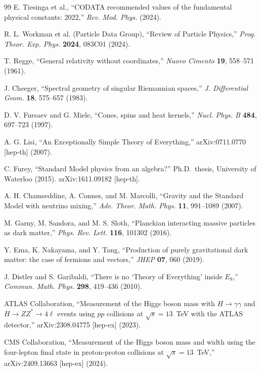 \documentclass[12pt,a4paper]{article}
\theoremstyle{definition}
\begin{document}
\begin{thebibliography}{99}
E. Tiesinga et al., ``CODATA recommended values of the fundamental physical constants: 2022,'' \textit{Rev. Mod. Phys.} (2024).

R. L. Workman et al. (Particle Data Group), ``Review of Particle Physics,'' \textit{Prog. Theor. Exp. Phys.} \textbf{2024}, 083C01 (2024).

T. Regge, ``General relativity without coordinates,'' \textit{Nuovo Cimento} \textbf{19}, 558--571 (1961).

J. Cheeger, ``Spectral geometry of singular Riemannian spaces,'' \textit{J. Differential Geom.} \textbf{18}, 575--657 (1983).

D. V. Fursaev and G. Miele, ``Cones, spins and heat kernels,'' \textit{Nucl. Phys. B} \textbf{484}, 697--723 (1997).

A. G. Lisi, ``An Exceptionally Simple Theory of Everything,'' arXiv:0711.0770 [hep-th] (2007).

C. Furey, ``Standard Model physics from an algebra?'' Ph.D.\ thesis, University of Waterloo (2015). arXiv:1611.09182 [hep-th].

A. H. Chamseddine, A. Connes, and M. Marcolli, ``Gravity and the Standard Model with neutrino mixing,'' \textit{Adv. Theor. Math. Phys.} \textbf{11}, 991--1089 (2007).

M. Garny, M. Sandora, and M. S. Sloth, ``Planckian interacting massive particles as dark matter,'' \textit{Phys. Rev. Lett.} \textbf{116}, 101302 (2016).

Y. Ema, K. Nakayama, and Y. Tang, ``Production of purely gravitational dark matter: the case of fermions and vectors,'' \textit{JHEP} \textbf{07}, 060 (2019).

J. Distler and S. Garibaldi, ``There is no `Theory of Everything' inside $E_8$,'' \textit{Commun. Math. Phys.} \textbf{298}, 419--436 (2010).

ATLAS Collaboration, ``Measurement of the Higgs boson mass with $H \to \gamma\gamma$ and $H \to ZZ^* \to 4\ell$ events using $pp$ collisions at $\sqrt{s} = 13$~TeV with the ATLAS detector,'' arXiv:2308.04775 [hep-ex] (2023).

CMS Collaboration, ``Measurement of the Higgs boson mass and width using the four-lepton final state in proton-proton collisions at $\sqrt{s} = 13$~TeV,'' arXiv:2409.13663 [hep-ex] (2024).


\end{thebibliography}
\end{document}
